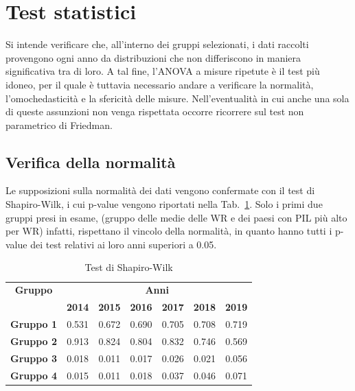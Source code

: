 \documentclass[conference]{IEEEtran}
\begin{document}
\section{Test statistici}

Si intende verificare che, all'interno dei gruppi selezionati,
i dati raccolti provengono ogni anno da distribuzioni che non differiscono
in maniera significativa tra di loro.
A tal fine, l'ANOVA a misure ripetute è il test più idoneo,
per il quale è tuttavia necessario andare a verificare la normalità,
l'omochedasticità e la sfericità delle misure.
Nell'eventualità in cui
anche una sola di queste assunzioni non venga rispettata occorre
ricorrere sul test non parametrico di Friedman.

\subsection{Verifica della normalità}

Le supposizioni sulla normalità dei dati vengono confermate
con il test di Shapiro-Wilk, i cui p-value vengono riportati nella Tab.~\ref{tab1}.
Solo i primi due gruppi presi in esame,
(gruppo delle medie delle WR e dei paesi con PIL più alto per WR)
infatti, rispettano il vincolo della normalità,
in quanto hanno tutti i p-value dei test relativi ai loro anni superiori a 0.05.
\begin{table}[htbp]
    \caption{Test di Shapiro-Wilk}
    \begin{center}
    \begin{tabular}{|c|c|c|c|c|c|c|}
    \hline
    \textbf{Gruppo}&\multicolumn{6}{|c|}{\textbf{Anni}} \\
    \cline{2-7} 
     & \textbf{2014} & \textbf{2015} & \textbf{2016} & \textbf{2017} & \textbf{2018} & \textbf{2019}\\
    \hline
    \textbf{Gruppo 1} & 0.531 & 0.672 & 0.690 & 0.705 & 0.708 & 0.719 \\\cline{1-7}
    \textbf{Gruppo 2} & 0.913 & 0.824 & 0.804 & 0.832 & 0.746 & 0.569 \\\cline{1-7}
    \textbf{Gruppo 3} & 0.018 & 0.011 & 0.017 & 0.026 & 0.021 & 0.056 \\\cline{1-7}
    \textbf{Gruppo 4} & 0.015 & 0.011 & 0.018 & 0.037 & 0.046 & 0.071 \\\cline{1-7}
    \hline
    \end{tabular}
    \label{tab1}
    \end{center}
\end{table}
\end{document}
